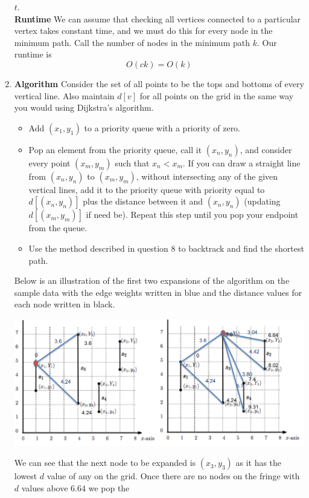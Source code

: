\documentclass[11pt]{article}
\begin{document}
\begin{enumerate}
		$t$.\\
		\textbf{Runtime}
		We can assume that checking all vertices connected to a particular
		vertex takes constant time, and we must do this for every node
		in the minimum path. Call the number of nodes in the minimum
		path $k$. Our runtime is 
		$$O(ck) = O(k)$$
		\item 
		\textbf{Algorithm}
		Consider the set of all points to be the tops and bottoms of every
		vertical line. Also maintain $d[v]$ for all points on the grid in the
		same way you would using Dijkstra's algorithm.
		\begin{itemize}
			\item Add $(x_1,y_1)$ to a priority queue with a
				priority of zero.
			\item Pop an element from the priority queue, call it
				$(x_n,y_n)$, 
				and consider every point $(x_m,y_m)$
				such that $x_n < x_m$. If you can draw a
				straight line from $(x_n,y_n)$ to $(x_m,y_m)$,
				without intersecting any of the given vertical
				lines,
				add it to the priority queue with priority equal
				to $d[(x_n,y_n)]$ plus the distance
				between it and $(x_n,y_n)$ (updating
				$d[(x_m,y_m)]$ if need be).  Repeat this step
				until you pop your endpoint from the queue.
			\item Use the method described in question $8$ to
				backtrack and find the shortest path.\\
		\end{itemize}
		Below is an illustration of the first two expansions of the
		algorithm on the sample data with the edge weights written in
		blue and the distance values for each node written in black.
		\begin{center}
		\includegraphics[width=1.00\textwidth]{images/fig3}
		\end{center}
		We can see that the next node to be expanded is $(x_3,y_3)$ as it has
		the lowest $d$ value of any on the grid. Once there are no
		nodes on the fringe with $d$ values above $6.64$ we pop the

\end{enumerate}
\end{document}
